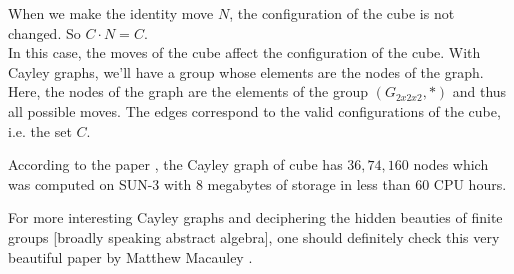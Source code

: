 When we make the identity move $N$, the configuration of the cube is not changed. So $C \cdot N = C$. 
\\
In this case, the moves of the cube affect the configuration of the cube. 
With Cayley graphs,  we'll have a group whose elements are the nodes of the graph. Here, the nodes of the graph are the elements of the group $(G_{2x2x2}, \scriptstyle*)$ and thus all possible moves. The edges correspond to the valid configurations of the cube, i.e. the set $C$. 

According to the paper \cite{cayleyrubik}, the Cayley graph of \Ttwo cube has $36, 74,160$ nodes which was computed on SUN-3 with 8 megabytes of storage in less than 60 CPU hours.





For more interesting Cayley graphs and deciphering the hidden beauties of finite groups [broadly speaking abstract algebra], one should definitely check this very beautiful paper by Matthew Macauley \cite{macauley2024revealing}. 
